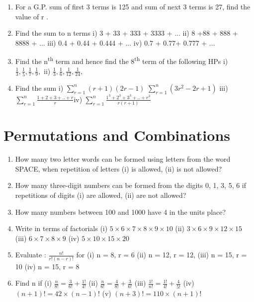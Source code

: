 \documentclass[14pt]{article}
\begin{document}
\begin{multicols}{2}
\begin{enumerate}[resume]
\item For a G.P. sum of first 3 terms is 125
and sum of next 3 terms is 27,
find the value of  r .

\item Find the sum to n terms i) 3 + 33 + 333 + 3333 + ...  ii) 8 +88 + 888 + 8888 + ... iii) 0.4 + 0.44 + 0.444 + ... iv) 0.7 + 0.77+ 0.777 + ...

\item Find the n\textsuperscript{th} term and hence find the 8\textsuperscript{th} term
of the following HPs i) $\frac{1}{3},\frac{1}{5},\frac{1}{7},\frac{1}{9},$ ii) $\frac{1}{3},\frac{1}{6},\frac{1}{12},\frac{1}{24},$  

\item Find the sum i) $\sum\limits_{r=1}^n (r+1)(2r-1)$
$\sum\limits_{r=1}^n (3r^2-2r+1)$ iii) $\sum\limits_{r=1}^n \frac{1+2+3+..+r}{r}$\quad iv) $\sum\limits_{r=1}^n \frac{1^3+2^3+3^3+..+r^3}{r(r+1)}$
\end{enumerate} 


\section{Permutations and Combinations}
\noindent
\begin{enumerate}[resume]
  
\item How many two letter words can be formed
using letters from the word SPACE, when
repetition of letters (i) is allowed, (ii) is not
allowed?
\item How many three-digit numbers can be
formed from the digits 0, 1, 3, 5, 6 if
repetitions of digits (i) are allowed, (ii) are
not allowed?
\item How many numbers between 100 and 1000
have 4 in the units place?
		 
\item Write in terms of factorials
(i)	$5 \times 6 \times 7 \times 8 \times 9 \times 10	$
(ii)	$3 \times 6 \times 9 \times 12 \times 15$
(iii)	$6 \times 7 \times 8 \times 9$
(iv)  $5 \times 10 \times 15 \times 20$

\item 
Evaluate : $\frac{n!}{r!(n-r)!}$ for  (i)	 n = 8, r = 6	 (ii)	 n = 12, r = 12,
	 (iii)	 n = 15, r = 10	 (iv)	 n = 15, r = 8
	 
\item Find n if
(i) $\frac{n}{8!}= \frac{3}{6!}+\frac{1!}{4!}$
(ii) $\frac{n}{6!}= \frac{4}{8!}+\frac{3}{6!}$
(iii) $\frac{1!}{n!}= \frac{1!}{4!}+\frac{4}{5!}$
(iv) $(n+1)!=42 \times (n-1)!$
(v) $(n+3)!=110 \times (n+1)!$


\end{enumerate}
\end{multicols}
\end{document}
